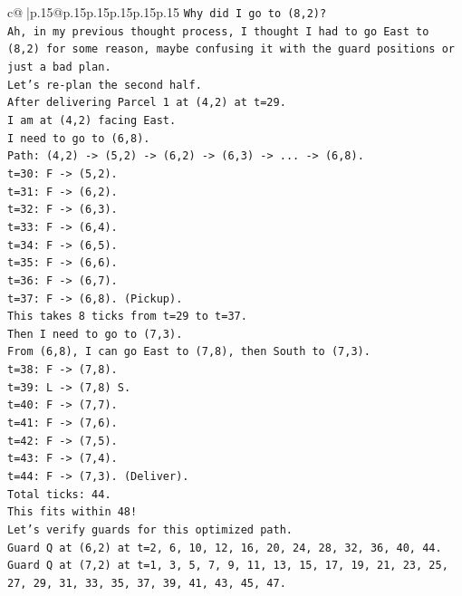 \documentclass{article}
\begin{document}
{\begin{supertabular}{c@{$\;$}|p{.15\linewidth}@{}p{.15\linewidth}p{.15\linewidth}p{.15\linewidth}p{.15\linewidth}p{.15\linewidth}}
{{{\texttt{Why did I go to (8,2)?} \\
\texttt{Ah, in my previous thought process, I thought I had to go East to (8,2) for some reason, maybe confusing it with the guard positions or just a bad plan.} \\
\texttt{Let's re{-}plan the second half.} \\
\texttt{After delivering Parcel 1 at (4,2) at t=29.} \\
\texttt{I am at (4,2) facing East.} \\
\texttt{I need to go to (6,8).} \\
\texttt{Path: (4,2) {-}> (5,2) {-}> (6,2) {-}> (6,3) {-}> ... {-}> (6,8).} \\
\texttt{t=30: F {-}> (5,2).} \\
\texttt{t=31: F {-}> (6,2).} \\
\texttt{t=32: F {-}> (6,3).} \\
\texttt{t=33: F {-}> (6,4).} \\
\texttt{t=34: F {-}> (6,5).} \\
\texttt{t=35: F {-}> (6,6).} \\
\texttt{t=36: F {-}> (6,7).} \\
\texttt{t=37: F {-}> (6,8). (Pickup).} \\
\texttt{This takes 8 ticks from t=29 to t=37.} \\
\texttt{Then I need to go to (7,3).} \\
\texttt{From (6,8), I can go East to (7,8), then South to (7,3).} \\
\texttt{t=38: F {-}> (7,8).} \\
\texttt{t=39: L {-}> (7,8) S.} \\
\texttt{t=40: F {-}> (7,7).} \\
\texttt{t=41: F {-}> (7,6).} \\
\texttt{t=42: F {-}> (7,5).} \\
\texttt{t=43: F {-}> (7,4).} \\
\texttt{t=44: F {-}> (7,3). (Deliver).} \\
\texttt{Total ticks: 44.} \\
\texttt{This fits within 48!} \\
\texttt{Let's verify guards for this optimized path.} \\
\texttt{Guard Q at (6,2) at t=2, 6, 10, 12, 16, 20, 24, 28, 32, 36, 40, 44.} \\
\texttt{Guard Q at (7,2) at t=1, 3, 5, 7, 9, 11, 13, 15, 17, 19, 21, 23, 25, 27, 29, 31, 33, 35, 37, 39, 41, 43, 45, 47.} \\
}}}
\end{supertabular}}
\end{document}
